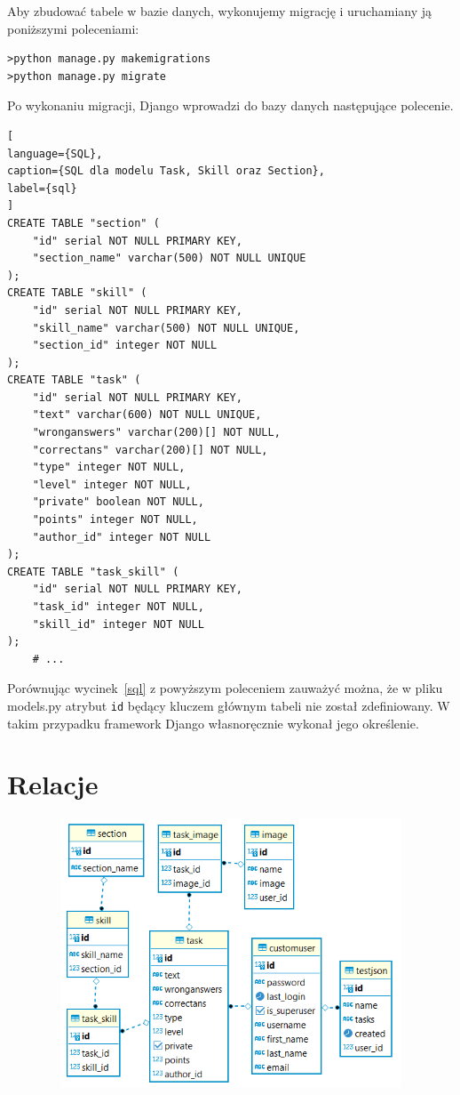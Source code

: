 \documentclass[oneside,polski,logo,indent]{amuthesis}
\begin{document}
\begin{enumerate}
\begin{enumerate}
Aby zbudować tabele w bazie danych, wykonujemy migrację i uruchamiany ją poniższymi poleceniami: 

\begin{lstlisting}[style=DOS]
>python manage.py makemigrations
>python manage.py migrate
\end{lstlisting}
Po wykonaniu migracji, Django wprowadzi do bazy danych następujące polecenie.
\begin{lstlisting}[
language={SQL},
caption={SQL dla modelu Task, Skill oraz Section},
label={sql}
]
CREATE TABLE "section" (
	"id" serial NOT NULL PRIMARY KEY, 
	"section_name" varchar(500) NOT NULL UNIQUE
);
CREATE TABLE "skill" (
	"id" serial NOT NULL PRIMARY KEY, 
	"skill_name" varchar(500) NOT NULL UNIQUE, 
	"section_id" integer NOT NULL
);
CREATE TABLE "task" (
	"id" serial NOT NULL PRIMARY KEY, 
	"text" varchar(600) NOT NULL UNIQUE, 
	"wronganswers" varchar(200)[] NOT NULL, 
	"correctans" varchar(200)[] NOT NULL,
	"type" integer NOT NULL, 
	"level" integer NOT NULL, 
	"private" boolean NOT NULL, 
	"points" integer NOT NULL, 
	"author_id" integer NOT NULL
);
CREATE TABLE "task_skill" (
	"id" serial NOT NULL PRIMARY KEY, 
	"task_id" integer NOT NULL, 
	"skill_id" integer NOT NULL
);
	# ...
\end{lstlisting}

Porównując wycinek~\ref{sql} z powyższym poleceniem zauważyć można, że w pliku models.py atrybut \texttt{id} będący kluczem głównym tabeli nie został zdefiniowany. W takim przypadku framework Django własnoręcznie wykonał jego określenie.

\section{Relacje}

\begin{figure}[H]
  \centering
  \includegraphics[width=12cm, height=8cm]{gl-relacje.png}
  \caption{}
  \label{relacje}
\end{figure}


\end{enumerate}
\end{enumerate}
\end{document}
